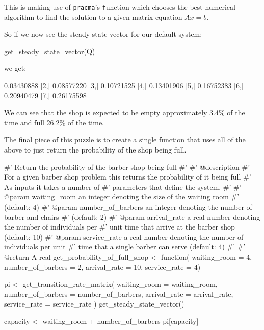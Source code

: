 This is making use of \texttt{pracma}'s \texttt function
which chooses the best numerical algorithm to find the solution to a given
matrix equation \(Ax=b\).

So if we now see the steady state vector for our default system:

\begin{Rin}
get_steady_state_vector(Q)
\end{Rin}

we get:

\begin{Rout}
           [,1]
[1,] 0.03430888
[2,] 0.08577220
[3,] 0.10721525
[4,] 0.13401906
[5,] 0.16752383
[6,] 0.20940479
[7,] 0.26175598
\end{Rout}

We can see that the shop is expected to be empty approximately 3.4\% of the time
and full 26.2\% of the time.

The final piece of this puzzle is to create a single function that uses all of
the above to just return the probability of the shop being full.

\begin{Rin}
#' Return the probability of the barber shop being full
#'
#' @description
#' For a given barber shop problem this returns the probability of it being full
#' As inputs it takes a number of
#' parameters that define the system.
#'
#' @param waiting_room an integer denoting the size of the waiting room
#' (default: 4)
#' @param number_of_barbers an integer denoting the number of barber and chairs
#' (default: 2)
#' @param arrival_rate a real number denoting the number of individuals per
#' unit time that arrive at the barber shop (default: 10)
#' @param service_rate a real number denoting the number of individuals per unit
#' time that a single barber can serve (default: 4)
#'
#' @return A real
get_probability_of_full_shop <- function(
                                         waiting_room = 4,
                                         number_of_barbers = 2,
                                         arrival_rate = 10,
                                         service_rate = 4) {
  pi <- get_transition_rate_matrix(
    waiting_room = waiting_room,
    number_of_barbers = number_of_barbers,
    arrival_rate = arrival_rate,
    service_rate = service_rate
  ) %
    get_steady_state_vector()

  capacity <- waiting_room + number_of_barbers
  pi[capacity]
}
\end{Rin}

